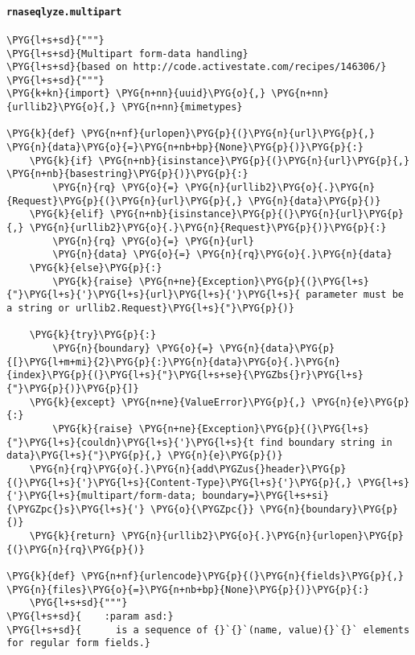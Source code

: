 \paragraph{\texttt{rnaseqlyze.multipart}}
\label{index-pdf4:rnaseqlyze-multipart}
\begin{Verbatim}[commandchars=\\\{\}]
\PYG{l+s+sd}{"""}
\PYG{l+s+sd}{Multipart form-data handling}
\PYG{l+s+sd}{based on http://code.activestate.com/recipes/146306/}
\PYG{l+s+sd}{"""}
\PYG{k+kn}{import} \PYG{n+nn}{uuid}\PYG{o}{,} \PYG{n+nn}{urllib2}\PYG{o}{,} \PYG{n+nn}{mimetypes}

\PYG{k}{def} \PYG{n+nf}{urlopen}\PYG{p}{(}\PYG{n}{url}\PYG{p}{,} \PYG{n}{data}\PYG{o}{=}\PYG{n+nb+bp}{None}\PYG{p}{)}\PYG{p}{:}
    \PYG{k}{if} \PYG{n+nb}{isinstance}\PYG{p}{(}\PYG{n}{url}\PYG{p}{,} \PYG{n+nb}{basestring}\PYG{p}{)}\PYG{p}{:}
        \PYG{n}{rq} \PYG{o}{=} \PYG{n}{urllib2}\PYG{o}{.}\PYG{n}{Request}\PYG{p}{(}\PYG{n}{url}\PYG{p}{,} \PYG{n}{data}\PYG{p}{)}
    \PYG{k}{elif} \PYG{n+nb}{isinstance}\PYG{p}{(}\PYG{n}{url}\PYG{p}{,} \PYG{n}{urllib2}\PYG{o}{.}\PYG{n}{Request}\PYG{p}{)}\PYG{p}{:}
        \PYG{n}{rq} \PYG{o}{=} \PYG{n}{url}
        \PYG{n}{data} \PYG{o}{=} \PYG{n}{rq}\PYG{o}{.}\PYG{n}{data}
    \PYG{k}{else}\PYG{p}{:}
        \PYG{k}{raise} \PYG{n+ne}{Exception}\PYG{p}{(}\PYG{l+s}{"}\PYG{l+s}{'}\PYG{l+s}{url}\PYG{l+s}{'}\PYG{l+s}{ parameter must be a string or urllib2.Request}\PYG{l+s}{"}\PYG{p}{)}

    \PYG{k}{try}\PYG{p}{:}
        \PYG{n}{boundary} \PYG{o}{=} \PYG{n}{data}\PYG{p}{[}\PYG{l+m+mi}{2}\PYG{p}{:}\PYG{n}{data}\PYG{o}{.}\PYG{n}{index}\PYG{p}{(}\PYG{l+s}{"}\PYG{l+s+se}{\PYGZbs{}r}\PYG{l+s}{"}\PYG{p}{)}\PYG{p}{]}
    \PYG{k}{except} \PYG{n+ne}{ValueError}\PYG{p}{,} \PYG{n}{e}\PYG{p}{:}
        \PYG{k}{raise} \PYG{n+ne}{Exception}\PYG{p}{(}\PYG{l+s}{"}\PYG{l+s}{couldn}\PYG{l+s}{'}\PYG{l+s}{t find boundary string in data}\PYG{l+s}{"}\PYG{p}{,} \PYG{n}{e}\PYG{p}{)}
    \PYG{n}{rq}\PYG{o}{.}\PYG{n}{add\PYGZus{}header}\PYG{p}{(}\PYG{l+s}{'}\PYG{l+s}{Content-Type}\PYG{l+s}{'}\PYG{p}{,} \PYG{l+s}{'}\PYG{l+s}{multipart/form-data; boundary=}\PYG{l+s+si}{\PYGZpc{}s}\PYG{l+s}{'} \PYG{o}{\PYGZpc{}} \PYG{n}{boundary}\PYG{p}{)}
    \PYG{k}{return} \PYG{n}{urllib2}\PYG{o}{.}\PYG{n}{urlopen}\PYG{p}{(}\PYG{n}{rq}\PYG{p}{)}

\PYG{k}{def} \PYG{n+nf}{urlencode}\PYG{p}{(}\PYG{n}{fields}\PYG{p}{,} \PYG{n}{files}\PYG{o}{=}\PYG{n+nb+bp}{None}\PYG{p}{)}\PYG{p}{:}
    \PYG{l+s+sd}{"""}
\PYG{l+s+sd}{    :param asd:}
\PYG{l+s+sd}{      is a sequence of {}`{}`(name, value){}`{}` elements for regular form fields.}


\end{Verbatim}
